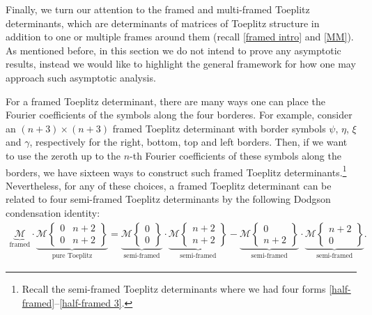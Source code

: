 \documentclass[10pt,a4paper]{amsart}
\numberwithin{equation}{section}
\newcommand{\ga}{\gamma}
\begin{document}
		
		Finally, we turn our attention to the framed and multi-framed Toeplitz determinants, which are determinants of matrices of Toeplitz structure in addition to one or multiple frames around them (recall \eqref{framed intro} and \eqref{MM}). As mentioned before, in this section we do not intend to prove any asymptotic results, instead we would like to highlight the general framework for how one may approach such asymptotic analysis.
		
		For a framed Toeplitz determinant, there are many ways one can place the Fourier coefficients of the symbols along the four borderes. For example, consider an $(n+3) \times (n+3)$ framed Toeplitz determinant with border symbols $\psi$, $\eta$, $\xi$ and $\ga$, respectively for the right, bottom, top and left borders. Then, if we want to use the zeroth up to the $n$-th Fourier coefficients of these symbols along the borders, we have sixteen ways to construct such framed Toeplitz determinants.\footnote{Recall the semi-framed Toeplitz determinants where we had four forms \eqref{half-framed}--\eqref{half-framed 3}.} Nevertheless, for any of these choices, a framed Toeplitz determinant can be related to four semi-framed Toeplitz determinants by the following Dodgson condensation identity:
		\begin{gather}\label{DODGSON framed B}
\underbrace{\mathscr{M}}_{\text{framed}}
			\cdot \underbrace{ \mathscr{M}\left\lbrace \begin{matrix} 0 & n+2 \\ 0 & n+2 \end{matrix} \right\rbrace }_{\text{pure Toeplitz}} = \underbrace{ \mathscr{M}\left\lbrace \begin{matrix} 0 \\ 0 \end{matrix} \right\rbrace }_{\text{semi-framed}} \cdot \underbrace{ \mathscr{M}\left\lbrace \begin{matrix} n+2 \\ n+2 \end{matrix} \right\rbrace}_{\text{semi-framed}} - \underbrace{ \mathscr{M}\left\lbrace \begin{matrix} 0 \\ n+2 \end{matrix} \right\rbrace}_{\text{semi-framed}} \cdot \underbrace{ \mathscr{M}\left\lbrace \begin{matrix} n+2 \\ 0 \end{matrix} \right\rbrace}_{\text{semi-framed}}.
		\end{gather}
		
\end{document}
